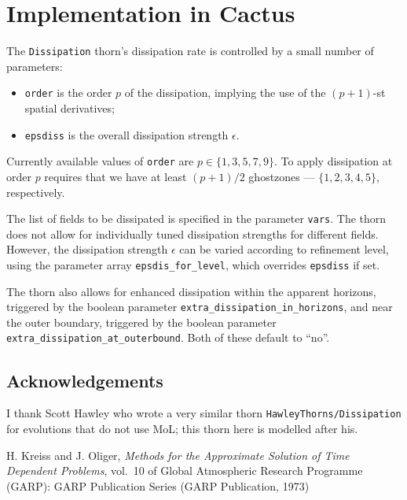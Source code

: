\section{Implementation in Cactus}

The \texttt{Dissipation} thorn's dissipation rate is controlled by a small number of parameters:
%
\begin{itemize}
  \item \texttt{order} is the order $p$ of the dissipation, implying the use of the $(p+1)$-st spatial derivatives;
  \item \texttt{epsdiss} is the overall dissipation strength $\epsilon$.
\end{itemize}

Currently available values of \texttt{order} are $p \in \{1, 3, 5, 7, 9\}$. To apply dissipation at
order $p$ requires that we have at least $(p+1)/2$ ghostzones --- $\{1, 2, 3, 4, 5\}$, respectively.

The list of fields to be dissipated is specified in the parameter \texttt{vars}. The thorn does
not allow for individually tuned dissipation strengths for different fields. However, the
dissipation strength $\epsilon$ can be varied according to refinement level, using the parameter
array \texttt{epsdis\_for\_level}, which overrides \texttt{epsdiss} if set.

The thorn also allows for enhanced dissipation within the apparent horizons, triggered by the
boolean parameter \texttt{extra\_dissipation\_in\_horizons}, and near the outer boundary,
triggered by the boolean parameter \texttt{extra\_dissipation\_at\_outerbound}. Both of these
default to ``no''.

\subsection{Acknowledgements}
I thank Scott Hawley who wrote a very similar thorn
\texttt{HawleyThorns/Dissipation} for evolutions that do not use MoL;
this thorn here is modelled after his.

\begin{thebibliography}{9}
H. Kreiss and J. Oliger, \emph{Methods for the Approximate Solution of
Time Dependent Problems}, vol.\ 10 of Global Atmospheric Research
Programme (GARP): GARP Publication Series (GARP Publication, 1973)
\end{thebibliography}



